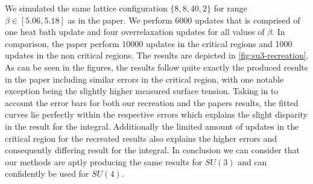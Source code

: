 \documentclass[english,twoside,openright]{UH_TCM_MSc}
\begin{document}
We simulated the same lattice configuration $\{8,8,40,2\}$ for range $\beta \in [5.06,5.18]$ as in the paper. We perform 6000 updates that is comprised of one heat bath update and four overrelaxation updates for all values of $\beta$. In comparison, the paper perform $10000$ updates in the critical regions and 1000 updates in the non critical regions. The results are depicted in \ref{fig:su3-recreation}. As can be seen in the figures, the results follow quite exactly the produced results in the paper including similar errors in the critical region, with one notable exception being the slightly higher measured surface tension. Taking in to account the error bars for both our recreation and the papers results, the fitted curves lie perfectly within the respective errors which explains the slight disparity in the result for the integral. Additionally the limited amount of updates in the critical region for the recreated results also explains the higher errors and consequently differing result for the integral. In conclusion we can consider that our methods are aptly producing the same results for $SU(3)$ and can confidently be used for $SU(4)$.
\end{document}
